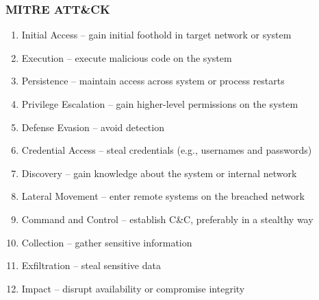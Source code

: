 \documentclass[final]{article}
\begin{document}
\subsubsection*{MITRE ATT\&CK}
\begin{enumerate}[nosep]
    \item Initial Access -- gain initial foothold in target network or system
    \item Execution -- execute malicious code on the system
    \item Persistence -- maintain access across system or process restarts
    \item Privilege Escalation -- gain higher-level permissions on the system
    \item Defense Evasion -- avoid detection
    \item Credential Access -- steal credentials (e.g., usernames and passwords)
    \item Discovery -- gain knowledge about the system or internal network
    \item Lateral Movement -- enter remote systems on the breached network
    \item Command and Control -- establish C\&C, preferably in a stealthy way
    \item Collection -- gather sensitive information
    \item Exfiltration -- steal sensitive data
    \item Impact -- disrupt availability or compromise integrity
\end{enumerate}
\end{document}
